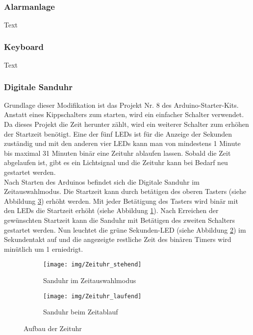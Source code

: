 \subsubsection{Alarmanlage}
Text

\subsubsection{Keyboard}
Text

\subsubsection{Digitale Sanduhr}
Grundlage dieser Modifikation ist das Projekt Nr. 8 des Arduino-Starter-Kits. Anstatt eines Kippschalters zum starten, wird ein einfacher Schalter verwendet. Da dieses Projekt die Zeit herunter zählt, wird ein weiterer Schalter zum erhöhen der Startzeit benötigt. Eine der fünf LEDs ist für die Anzeige der Sekunden zuständig und mit den anderen vier LEDs kann man von mindestens 1 Minute bis maximal 31 Minuten binär eine Zeituhr ablaufen lassen. Sobald die Zeit abgelaufen ist, gibt es ein Lichtsignal und die Zeituhr kann bei Bedarf neu gestartet werden.\\
Nach Starten des Arduinos befindet sich die Digitale Sanduhr im Zeitauswahlmodus. Die Startzeit kann durch betätigen des oberen Tasters (siehe Abbildung \ref{Zeituhr}) erhöht werden. Mit jeder Betätigung des Tasters wird binär mit den LEDs die Startzeit erhöht (siehe Abbildung \ref{stehend}). Nach Erreichen der gewünschten Startzeit kann die Sanduhr mit Betätigen des zweiten Schalters gestartet werden. Nun leuchtet die grüne Sekunden-LED (siehe Abbildung \ref{laufend}) im Sekundentakt auf und die angezeigte restliche Zeit des binären Timers wird minütlich um 1 erniedrigt.\\

\begin{figure}[h]
	\centering
	\begin{subfigure}[b]{0.48\linewidth}
		\centering
		\texttt{[image: img/Zeituhr\_stehend]}
		\caption{Sanduhr im Zeitauswahlmodus}\label{stehend}
	\end{subfigure}\enspace%
	\begin{subfigure}[b]{0.48\linewidth}
		\centering
		\texttt{[image: img/Zeituhr\_laufend]}
		\caption{Sanduhr beim Zeitablauf}\label{laufend}
	\end{subfigure}
	\caption{Aufbau der Zeituhr}\label{Zeituhr}
\end{figure}

